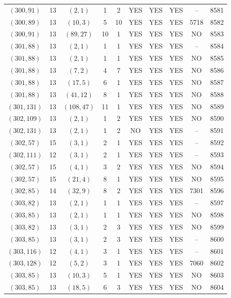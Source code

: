 \begin{longtable}{|c|c|c|c|c|c|c|c|c|c|}
$(300, 91)$ & 13 & $(2, 1)$ & 1 & 2 & YES & YES & YES & -- & 8581\\
$(300, 89)$ & 13 & $(10, 3)$ & 5 & 10 & YES & YES & YES & 5718 & 8582\\
$(300, 91)$ & 13 & $(89, 27)$ & 10 & 1 & YES & YES & YES & NO & 8583\\
$(301, 88)$ & 13 & $(2, 1)$ & 1 & 1 & YES & YES & YES & -- & 8584\\
$(301, 88)$ & 13 & $(2, 1)$ & 1 & 1 & YES & YES & YES & NO & 8585\\
$(301, 88)$ & 13 & $(7, 2)$ & 4 & 7 & YES & YES & YES & NO & 8586\\
$(301, 88)$ & 13 & $(17, 5)$ & 6 & 1 & YES & YES & YES & NO & 8587\\
$(301, 88)$ & 13 & $(41, 12)$ & 8 & 1 & YES & YES & YES & NO & 8588\\
$(301, 131)$ & 13 & $(108, 47)$ & 11 & 1 & YES & YES & YES & NO & 8589\\
$(302, 109)$ & 13 & $(2, 1)$ & 1 & 2 & YES & YES & YES & NO & 8590\\
$(302, 131)$ & 13 & $(2, 1)$ & 1 & 2 & NO & YES & YES & -- & 8591\\
$(302, 57)$ & 15 & $(3, 1)$ & 2 & 1 & YES & YES & YES & -- & 8592\\
$(302, 111)$ & 12 & $(3, 1)$ & 2 & 1 & YES & YES & YES & -- & 8593\\
$(302, 57)$ & 15 & $(4, 1)$ & 3 & 2 & YES & YES & YES & NO & 8594\\
$(302, 57)$ & 15 & $(21, 4)$ & 8 & 1 & YES & YES & YES & NO & 8595\\
$(302, 85)$ & 14 & $(32, 9)$ & 8 & 2 & YES & YES & YES & 7301 & 8596\\
$(303, 82)$ & 13 & $(2, 1)$ & 1 & 1 & YES & YES & YES & -- & 8597\\
$(303, 85)$ & 13 & $(2, 1)$ & 1 & 1 & YES & YES & YES & NO & 8598\\
$(303, 82)$ & 13 & $(3, 1)$ & 2 & 3 & YES & YES & YES & NO & 8599\\
$(303, 85)$ & 13 & $(3, 1)$ & 2 & 3 & YES & YES & YES & -- & 8600\\
$(303, 116)$ & 12 & $(4, 1)$ & 3 & 1 & YES & YES & YES & -- & 8601\\
$(303, 128)$ & 12 & $(5, 2)$ & 3 & 1 & YES & YES & YES & 7060 & 8602\\
$(303, 85)$ & 13 & $(10, 3)$ & 5 & 1 & YES & YES & YES & NO & 8603\\
$(303, 85)$ & 13 & $(18, 5)$ & 6 & 3 & YES & YES & YES & NO & 8604\\

\end{longtable}
